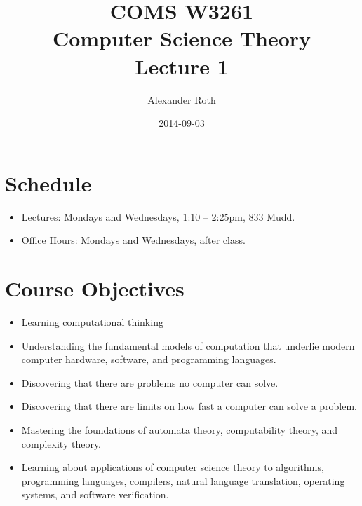 \documentclass[]{article}
\begin{document}
\newtheorem{keyword}{Definition}
\newtheorem{example}{Example}

\title{COMS W3261 \\ Computer Science Theory \\ Lecture 1}
\author{Alexander Roth}
\date{2014-09-03}
\maketitle
\section{Schedule}
\begin{itemize}
\item Lectures: Mondays and Wednesdays, 1:10 -- 2:25pm, 833 Mudd.
\item Office Hours: Mondays and Wednesdays, after class.
\end{itemize}

\section{Course Objectives}
\begin{itemize}
\item Learning computational thinking
\item Understanding the fundamental models of computation that underlie modern computer hardware, software, and programming languages.
\item Discovering that there are problems no computer can solve.
\item Discovering that there are limits on how fast a computer can solve a problem.
\item Mastering the foundations of automata theory, computability theory, and complexity theory.
\item Learning about applications of computer science theory to algorithms, programming languages, compilers, natural language translation, operating systems, and software verification.
\end{itemize}
\end{document}
